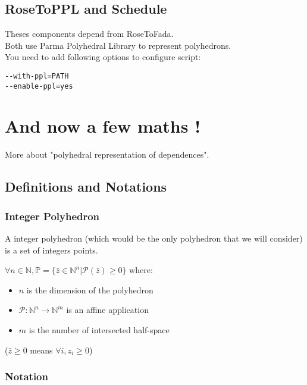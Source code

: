		\subsection{RoseToPPL and Schedule}

	Theses components depend from RoseToFada.\\
	Both use Parma Polyhedral Library \cite{PPL} to represent polyhedrons.\\
	You need to add following options to configure script:
\begin{verbatim}
--with-ppl=PATH
--enable-ppl=yes
\end{verbatim}
		

	\section{And now a few maths !}
	\label{polyhedric:maths}

More about "polyhedral representation of dependences".

		\subsection{Definitions and Notations}
		\label{polyhedric:maths:defs}

			\subsubsection{Integer Polyhedron}
			\label{polyhedric:maths:defs:polyhedron}

A integer polyhedron (which would be the only polyhedron that we will consider) is a set of integers points.

$\forall n \in \mathbb{N}, \mathbb{P} = \{\bar{z} \in \mathbb{N}^{n} | \mathcal{P}(\bar{z}) \geq 0 \}$ where:
\begin{itemize}
	\item $n$ is the dimension of the polyhedron
	\item $\mathcal{P}: \mathbb{N}^{n} \rightarrow \mathbb{N}^{m}$ is an affine application
	\item $m$ is the number of intersected half-space
\end{itemize}
($\bar{z} \geq 0$ means $\forall i, z_{i} \geq 0$)

			\subsubsection{Notation}
			\label{polyhedric:maths:defs:notation}


